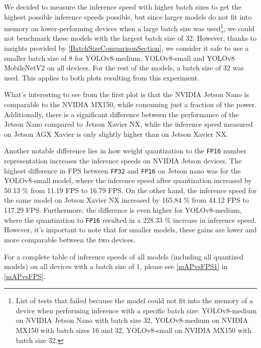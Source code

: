 We decided to measure the inference speed with higher batch sizes to get the
highest possible inference speeds possible, but since larger models do not fit
into memory on lower-performing devices when a large batch size was
used\footnote{List of tests that failed because the model could not fit into
the memory of a device when performing inference with a specific batch size:
YOLOv8-medium on NVIDIA Jetson Nano with batch size 32, YOLOv8-medium on NVIDIA
MX150 with batch sizes 16 and 32, YOLOv8-small on NVIDIA MX150 with batch size
32.}, we could not benchmark these models with the largest batch size of 32.
However, thanks to insights provided by \autoref{BatchSizeComparisonSection}, we
consider it safe to use a smaller batch size of 8 for YOLOv8-medium,
YOLOv8-small and YOLOv8 MobileNetV2 on all devices. For the rest of the models,
a batch size of 32 was used. This applies to both plots resulting from this
experiment.

What's interesting to see from the first plot is that the NVIDIA Jetson Nano is
comparable to the NVIDIA MX150, while consuming just a fraction of the power.
Additionally, there is a significant difference between the performance of the
Jetson Nano compared to Jetson Xavier NX, while the inference speed measured on
Jetson AGX Xavier is only slightly higher than on Jetson Xavier NX.

Another notable difference lies in how weight quantization to the \texttt{FP16}
number representation increases the inference speeds on NVIDIA Jetson devices.
The highest difference in FPS between \texttt{FP32} and \texttt{FP16} on Jetson
nano was for the YOLOv8-small model, where the inference speed after
quantization increased by \num{50.13} \% from \num{11.19} FPS to \num{16.79}
FPS. On the other hand, the inference speed for the same model on Jetson Xavier
NX increased by \num{165.84} \% from \num{44.12} FPS to \num{117.29} FPS.
Furthermore, the difference is even higher for YOLOv8-medium, where the
quantization to \texttt{FP16} resulted in a \num{228.33} \% increase in
inference speed. However, it's important to note that for smaller models, these
gains are lower and more comparable between the two devices.

For a complete table of inference speeds of all models (including all quantized
models) on all devices with a batch size of 1, please see \autoref{mAPvsFPS1} in
\autoref{mAPvsFPS}.

